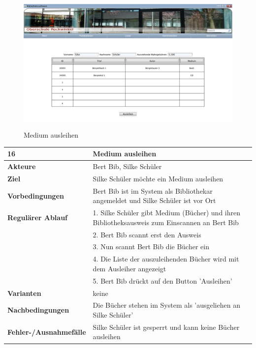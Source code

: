 \documentclass[fontsize=12pt,paper=a4,twoside]{scrartcl}
\begin{document}
\begin{figure}[htbp]
\caption{Medium ausleihen}
\includegraphics[width=1\textwidth]{ScreensWebsite/Ausleihe.png}
  \label{Medium ausleihen}
\end{figure}

\begin{table}[htbp]
\label{16}
\begin{tabular}{|l|p{10cm}|}
\hline 
\textbf{16} & \textbf{Medium ausleihen} \\ \hline
\textbf{Akteure} & Bert Bib, Silke Schüler\\ \hline
\textbf{Ziel} & Silke Schüler möchte ein Medium ausleihen \\ \hline
\textbf{Vorbedingungen} & Bert Bib ist im System als Bibliothekar angemeldet und Silke Schüler ist vor 
Ort \\ \hline
\textbf{Regulärer Ablauf} & 
1. Silke Schüler gibt Medium (Bücher) und ihren Bibliotheksausweis zum Einscannen an Bert Bib\\
&2. Bert Bib scannt erst den Ausweis\\
&3. Nun scannt Bert Bib die Bücher ein\\
&4. Die Liste der auszuleihenden Bücher wird mit dem Ausleiher angezeigt\\
&5. Bert Bib drückt auf den Button 'Ausleihen'\\
\hline
\textbf{Varianten} & 
keine \\ \hline
\textbf{Nachbedingungen} & Die Bücher stehen im System als 'ausgeliehen an Silke Schüler'\\ \hline
\textbf{Fehler-/Ausnahmefälle} & Silke Schüler ist gesperrt und kann keine Bücher ausleihen\\
\hline
\end{tabular}
\end{table}
\end{document}
